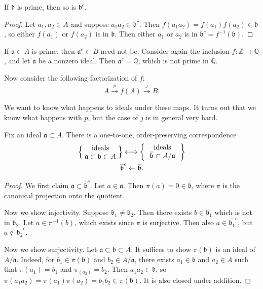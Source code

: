\documentclass[12pt]{article}
\begin{document}
\begin{proposition}
\label{prop_pullback_of_prime_is_prime}
	If $\mathfrak{b}$ is prime, then so is $\mathfrak{b}^c$.
\end{proposition}
\begin{proof}
	Let $a_1,a_2\in A$ and suppose $a_1a_2\in\mathfrak{b}^c$. Then $f(a_1a_2) = f(a_1)f(a_2) \in \mathfrak{b}$, so either $f(a_1)$ or $f(a_2)$ is in $\mathfrak{b}$. Then either $a_1$ or $a_2$ is in $\mathfrak{b}^c=f^{-1}(\mathfrak{b})$. 
\end{proof}

\begin{example}
	If $\mathfrak{a}\subset A$ is prime, then $\mathfrak{a}^e\subset B$ need not be. Consider again the inclusion $f:\mathbb{Z}\to\mathbb{Q}$, and let $\mathfrak{a}$ be a nonzero ideal. Then $\mathfrak{a}^e=\mathbb{Q}$, which is not prime in $\mathbb{Q}$. 
\end{example}

Now consider the following factorization of $f$:
\begin{equation*}
	A \overset{p}{\longrightarrow} f(A) \overset{j}{\longrightarrow} B.
\end{equation*}

We want to know what happens to ideals under these maps. It turns out that we know what happens with $p$, but the case of $j$ is in general very hard.

\begin{proposition}
\label{prop_ideal_correspondence_quotient}
	Fix an ideal $\mathfrak{a}\subset A$. There is a one-to-one, order-preserving correspondence
	\begin{gather*}
		\left\{\parbox{5em}{\centering{ideals $\mathfrak{a}\subset\mathfrak{b}\subset A$}}\right\} \longleftrightarrow \left\{\parbox{5em}{\centering{ideals $\overline{\mathfrak{b}}\subset A/\mathfrak{a}$}}\right\} \\
		\overline{\mathfrak{b}}^c \leftarrow \overline{\mathfrak{b}}.
	\end{gather*}
\end{proposition}
\begin{proof}
	We first claim $\mathfrak{a}\subset \overline{\mathfrak{b}}^c$. Let $a\in\mathfrak{a}$. Then $\pi(a) = 0 \in \overline{\mathfrak{b}}$, where $\pi$ is the canonical projection onto the quotient.

	Now we show injectivity. Suppose $\overline{\mathfrak{b}_1}\neq \overline{\mathfrak{b}_2}$. Then there exists $b\in\overline{\mathfrak{b}_1}$ which is not in $\overline{\mathfrak{b}_2}$. Let $a\in \pi^{-1}(b)$, which exists since $\pi$ is surjective. Then also $a\in \overline{\mathfrak{b}_1}^c$, but $a\not\in\overline{\mathfrak{b}_2}^c$. 

	Now we show surjectivity. Let $\mathfrak{a}\subset\mathfrak{b}\subset A$. It suffices to show $\pi(\mathfrak{b})$ is an ideal of $A/\mathfrak{a}$. Indeed, for $b_1\in \pi(\mathfrak{b})$ and $b_2\in A/\mathfrak{a}$, there exists $a_1\in\mathfrak{b}$ and $a_2\in A$ such that $\pi(a_1)=b_1$ and $\pi_(a_2)=b_2$. Then $a_1a_2\in\mathfrak{b}$, so $\pi(a_1a_2) = \pi(a_1)\pi(a_2)=b_1b_2\in \pi(\mathfrak{b})$. It is also closed under addition.
\end{proof}
\end{document}
